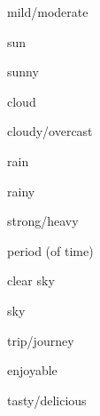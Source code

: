 \begin{flashcard}{\LARGE mild/moderate}
\LARGE {}
\end{flashcard}
\begin{flashcard}{\LARGE sun}
\LARGE {}
\end{flashcard}
\begin{flashcard}{\LARGE sunny}
\LARGE {}
\end{flashcard}
\begin{flashcard}{\LARGE cloud}
\LARGE {}
\end{flashcard}
\begin{flashcard}{\LARGE cloudy/overcast}
\LARGE {}
\end{flashcard}
\begin{flashcard}{\LARGE rain}
\LARGE {}
\end{flashcard}
\begin{flashcard}{\LARGE rainy}
\LARGE {}
\end{flashcard}
\begin{flashcard}{\LARGE strong/heavy}
\LARGE {}
\end{flashcard}
\begin{flashcard}{\LARGE period (of time)}
\LARGE {}
\end{flashcard}
\begin{flashcard}{\LARGE clear sky}
\LARGE {}
\end{flashcard}
\begin{flashcard}{\LARGE sky}
\LARGE {}
\end{flashcard}
\begin{flashcard}{\LARGE trip/journey}
\LARGE {}
\end{flashcard}
\begin{flashcard}{\LARGE enjoyable}
\LARGE {}
\end{flashcard}
\begin{flashcard}{\LARGE tasty/delicious}
\LARGE {}
\end{flashcard}
